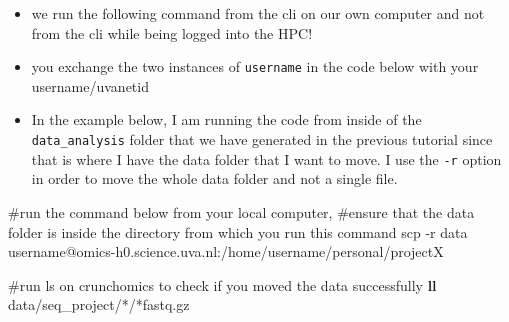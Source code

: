 \documentclass[
  letterpaper,
  DIV=11,
  numbers=noendperiod]{scrreprt}
\newenvironment{Shaded}{}{}
\newcommand{\AttributeTok}[1]{\textcolor[rgb]{0.84,0.23,0.29}{#1}}
\newcommand{\CommentTok}[1]{\textcolor[rgb]{0.42,0.45,0.49}{#1}}
\newcommand{\ExtensionTok}[1]{\textcolor[rgb]{0.84,0.23,0.29}{\textbf{#1}}}
\newcommand{\FunctionTok}[1]{\textcolor[rgb]{0.44,0.26,0.76}{#1}}
\newcommand{\NormalTok}[1]{\textcolor[rgb]{0.14,0.16,0.18}{#1}}
\newcommand{\PreprocessorTok}[1]{\textcolor[rgb]{0.84,0.23,0.29}{#1}}
\providecommand{\tightlist}{%
  \setlength{\itemsep}{0pt}\setlength{\parskip}{0pt}}\usepackage{longtable,booktabs,array}
\begin{document}
\begin{itemize}
\tightlist
\item
  we run the following command from the cli on our own computer and not
  from the cli while being logged into the HPC!
\item
  you exchange the two instances of \texttt{username} in the code below
  with your username/uvanetid
\item
  In the example below, I am running the code from inside of the
  \texttt{data\_analysis} folder that we have generated in the previous
  tutorial since that is where I have the data folder that I want to
  move. I use the \texttt{-r} option in order to move the whole data
  folder and not a single file.
\end{itemize}

\begin{Shaded}
\begin{Highlighting}[]
\CommentTok{\#run the command below from your local computer, }
\CommentTok{\#ensure that the data folder is inside the directory from which you run this command}
\FunctionTok{scp} \AttributeTok{{-}r}\NormalTok{ data username@omics{-}h0.science.uva.nl:/home/username/personal/projectX}

\CommentTok{\#run ls on crunchomics to check if you moved the data successfully}
\ExtensionTok{ll}\NormalTok{ data/seq\_project/}\PreprocessorTok{*}\NormalTok{/}\PreprocessorTok{*}\NormalTok{fastq.gz}
\end{Highlighting}
\end{Shaded}
\end{document}

